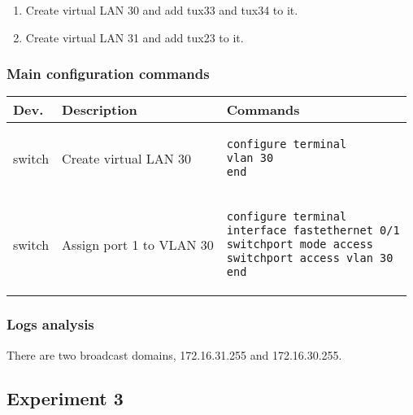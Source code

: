 \documentclass[a4paper, 11pt]{report}
\begin{document}
\begin{enumerate}
    \item Create virtual LAN 30 and add tux33 and tux34 to it.
    \item Create virtual LAN 31 and add tux23 to it.
\end{enumerate}

\subsubsection{Main configuration commands} \label{sec:Com2}

\begin{tabular}{l | p{75mm} | l}
    \textbf{Dev.} & \textbf{Description}                                  & \textbf{Commands}                       \\ \hline
    switch        & Create virtual LAN 30                                 &
        \begin{lstlisting}[frame=none, numbers=none, language=sh]
configure terminal
vlan 30
end
        \end{lstlisting} \\
    switch        & Assign port 1 to VLAN 30                              & 
        \begin{lstlisting}[frame=none, numbers=none, language=sh]
configure terminal
interface fastethernet 0/1
switchport mode access
switchport access vlan 30
end
        \end{lstlisting} \\
\end{tabular}

\subsubsection{Logs analysis} \label{sec:Log2}

There are two broadcast domains, 172.16.31.255 and 172.16.30.255.

\subsection{Experiment 3} \label{sec:Exp3}
\end{document}
